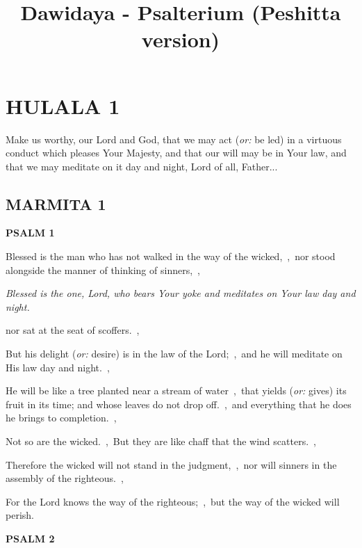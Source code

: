 \documentclass[12pt,twoside,a5paper]{article}
\newcommand{\hulala}[1]{\section*{HULALA {#1}}}
\newcommand{\marmita}[1]{\subsection*{MARMITA {#1}}}
\newcommand{\psalm}[1]{\textbf{PSALM {#1}}}
\newcommand{\qanona}[1]{{\liturgicalhint{Qanona.} \emph{#1}}}
\newcommand{\slota}[1]{\liturgicalhint{Slota.} #1}
\newcommand{\translationoption}[1]{\emph{or:} #1}
\begin{document}
\title{Dawidaya - Psalterium (Peshitta version)}
\author{}
\date{}
\maketitle


\hulala{1}

\slota{Make us worthy, our Lord and God, that we may act (\translationoption{be led})  in a virtuous conduct which pleases Your Majesty, and that our will may be in Your law, and that we may meditate on it day and night, Lord of all, Father...}

\marmita{1}

\psalm{1}

\begin{normalparskip}
Blessed is the man who has not walked in the way of the wicked,~\sep\ nor stood alongside the manner of thinking of sinners,~\sep

\qanona{Blessed is the one, Lord, who bears Your yoke and meditates on Your law day and night.}

nor sat at the seat of scoffers.~\sep

But his delight (\translationoption{desire}) is in the law of the Lord;~\sep\ and he will meditate on His law day and night.~\sep

He will be like a tree planted near a stream of water~\sep\ that yields (\translationoption{gives}) its fruit in its time; and whose leaves do not drop off.~\sep\ and everything that he does he brings to completion.~\sep

Not so are the wicked.~\sep\ But they are like chaff that the wind scatters.~\sep

Therefore the wicked will not stand in the judgment,~\sep\ nor will sinners in the assembly of the righteous.~\sep

For the Lord knows the way of the righteous;~\sep\ but the way of the wicked will perish.
\end{normalparskip}

\psalm{2}
\end{document}
